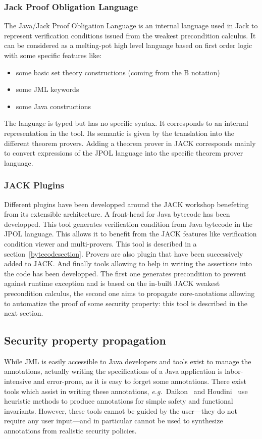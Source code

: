 \subsubsection{Jack Proof Obligation Language}
 \label{JPOL}
The Java/Jack Proof Obligation Language is an internal language used in Jack to represent verification conditions issued from the weakest precondition calculus. It can be considered as a melting-pot high level language based on first order logic with some specific features like:
\begin{itemize}
\item some basic set theory constructions (coming from the B notation)
\item some JML keywords
\item some Java constructions
\end{itemize}
The language is typed but has no specific syntax. It corresponds to an internal representation in the tool. Its semantic is given by the translation into the different theorem provers. Adding a theorem prover in JACK corresponds mainly to convert expressions of the JPOL language into the specific theorem prover language.

\subsubsection{JACK Plugins}
Different plugins have been developped around the JACK workshop benefeting from its extensible architecture. A front-head for Java bytecode has been developped. This tool generates verification condition from Java bytecode in the JPOL language. This allows it to benefit from the JACK features like verification condition viewer and multi-provers. This tool is described in a section~\ref{bytecodesection}. Provers are also plugin that have been successively added to JACK. And finally tools allowing to help in writing the assertions into the code has been developped. The first one generates precondition to prevent against runtime exception and is based on the in-built JACK weakest precondition calculus, the second one aims to propagate core-anotations allowing to automatize the proof of some security property: this tool is described in the next section.


\subsection{Security property propagation}\label{sec:highlevel}

While JML is easily accessible to Java developers and tools exist
to manage the annotations, actually writing
the specifications of a Java application is labor-intensive and
error-prone, as it is easy to forget some annotations. There
exist tools which assist in writing these annotations,
\emph{e.g.}~Daikon~\cite{ErnstCGN2001:TSE} and Houdini~\cite{FlanaganL01}
use heuristic methods to produce annotations for simple safety and
functional invariants.  However, these tools cannot be guided by the
user---they do not require any user input---and in particular cannot
be used to synthesize annotations from realistic security policies.

